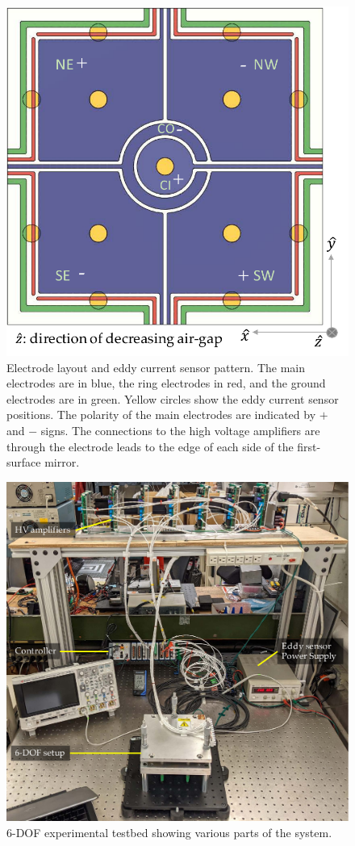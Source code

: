 \documentclass[letterpaper,10pt,onecolumn]{aspe}
\begin{document}
\begin{figure}
    \centering
    \includegraphics[width=0.8\linewidth]{Electrode_eddy_pattern.pdf}
    \caption[]{Electrode layout and eddy current sensor pattern. The main electrodes are in blue, the ring electrodes in red, and the ground electrodes are in green. Yellow circles show the eddy current sensor positions. The polarity of the main electrodes are indicated by \(+\) and \(-\) signs. The connections to the high voltage amplifiers are through the electrode leads to the edge of each side of the first-surface mirror.}\label{fig:electrode_pattern}
\end{figure}

\begin{figure}[!b]
    \centering
    \includegraphics[width=0.95\linewidth]{6DOF_Levitation_Setup_labels_v3.pdf}
    \caption[]{6-DOF experimental testbed showing various parts of the system. }\label{fig:6-DOF_setup_full}
\end{figure}
\end{document}
